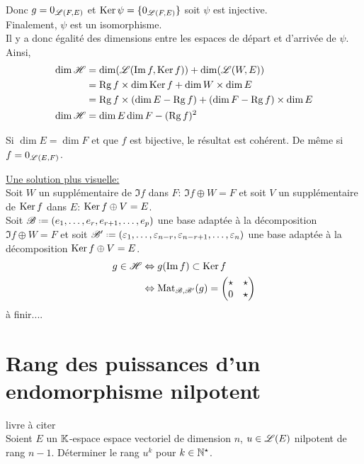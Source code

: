 \begin{solution}
\begin{itemize}
\begin{itemize}
            Donc $g = 0_{\mathscr{L}(F, E)}$ et $\mathrm{Ker}\, \psi = \{ 0_{\mathscr{L}(F, E)} \}$ soit $\psi$ est injective. \\
            Finalement, $\psi$ est un isomorphisme. \\
            Il y a donc égalité des dimensions entre les espaces de départ et d'arrivée de $\psi$. Ainsi,
            \begin{align*}
                \dim \mathscr{H} &= \dim(\mathscr{L}(\Im f, \mathrm{Ker}\, f)) + \dim (\mathscr{L}(W, E)) \\
                &= \mathrm{Rg}\, f \times \dim \mathrm{Ker}\, f + \dim W \times \dim E \\
                &= \mathrm{Rg}\, f \times (\dim E - \mathrm{Rg}\, f) + (\dim F - \mathrm{Rg}\, f) \times \dim E \\
                \dim \mathscr{H} &= \dim E \dim F - (\mathrm{Rg}\, f)^2
            \end{align*}
        \end{itemize}
        \begin{remarque}
            Si $\dim E = \dim F$ et que $f$ est bijective, le résultat est cohérent. De même si $f = 0_{\mathscr{L}(E, F)}$.
        \end{remarque}
    \end{itemize}
    \underline{Une solution plus visuelle:} \\
    Soit $W$ un supplémentaire de $\Im f$ dans $F$: $\Im f \oplus W = F$ et soit $V$ un supplémentaire de $\mathrm{Ker}\, f$ dans $E$: $\mathrm{Ker}\, f \oplus V = E$. \\
    Soit $\mathscr{B} \defeq (e_1, \dots, e_r, e_{r+1}, \dots, e_p)$ une base adaptée à la décomposition $\Im f \oplus W = F$ et soit $\mathscr{B}' \defeq (\varepsilon_1, \dots, \varepsilon_{n-r}, \varepsilon_{n-r+1}, \dots, \varepsilon_n)$ une base adaptée à la décomposition $\mathrm{Ker}\, f \oplus V = E$.
    \begin{align*}
        g \in \mathscr{H} &\Leftrightarrow g(\Im f) \subset \mathrm{Ker}\, f \\
        &\Leftrightarrow \mathrm{Mat}_{\mathscr{B}, \mathscr{B}'}(g) = 
        \begin{pmatrix}
            \star & \star \\
            0 & \star
        \end{pmatrix}
    \end{align*}
    à finir....
\end{solution}

\section{Rang des puissances d'un endomorphisme nilpotent}
\begin{exercice}
    livre à citer \\
    Soient $E$ un $\mathbb{K}$-espace espace vectoriel de dimension $n$, $u \in \mathscr{L}(E)$ nilpotent de rang $n-1$. Déterminer le rang $u^k$ pour $k \in \mathbb{N}^\star$. 
\end{exercice}

